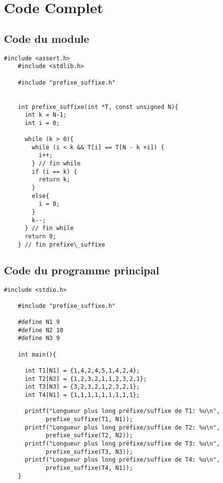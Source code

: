 \section{Code Complet}\label{code}

\subsection{Code du module}
\begin{lstlisting}[caption={prefixe\_suffixe.c}]
    #include <assert.h>
    #include <stdlib.h>
    
    #include "prefixe_suffixe.h"
    
    
    int prefixe_suffixe(int *T, const unsigned N){
      int k = N-1;
      int i = 0;
    
      while (k > 0){
        while (i < k && T[i] == T[N - k +i]) {
          i++;
        } // fin while
        if (i == k) {
          return k;
        }
        else{
          i = 0;
        }
        k--;
      } // fin while
      return 0;
    } // fin prefixe\_suffixe
\end{lstlisting}

\subsection{Code du programme principal}
\begin{lstlisting}[caption={main-prefixe\_suffixe.c}]
    #include <stdio.h>

    #include "prefixe_suffixe.h"
    
    #define N1 9
    #define N2 10
    #define N3 9
    
    int main(){
    
      int T1[N1] = {1,4,2,4,5,1,4,2,4};
      int T2[N2] = {1,2,3,2,1,1,2,3,2,1};
      int T3[N3] = {3,2,3,2,1,2,3,2,1};
      int T4[N1] = {1,1,1,1,1,1,1,1,1};
    
      printf("Longueur plus long préfixe/suffixe de T1: %u\n", 
            prefixe_suffixe(T1, N1));
      printf("Longueur plus long préfixe/suffixe de T2: %u\n", 
            prefixe_suffixe(T2, N2));
      printf("Longueur plus long préfixe/suffixe de T3: %u\n", 
            prefixe_suffixe(T3, N3));
      printf("Longueur plus long préfixe/suffixe de T4: %u\n", 
            prefixe_suffixe(T4, N1));
    }
\end{lstlisting}


